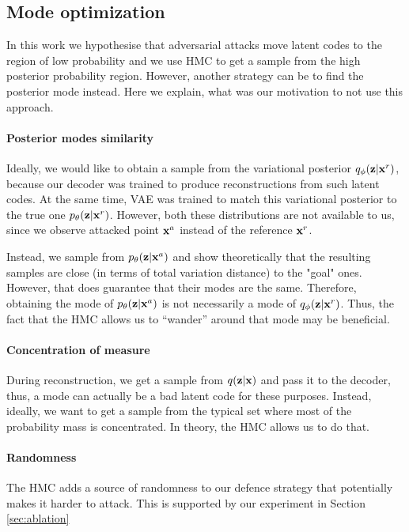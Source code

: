 
\subsection{Mode optimization}\label{appendix:hmc_vs_opt}

In this work we hypothesise that adversarial attacks move latent codes to the region of low probability and we use HMC to get a sample from the high posterior probability region. However, another strategy can be to find the posterior mode instead. Here we explain, what was our motivation to not use this approach. 

\paragraph{Posterior modes similarity}
Ideally, we would like to obtain a sample from the variational posterior $q_{\phi}({\mathbf{z}}|{\mathbf{x}}^r)$, because our decoder was trained to produce reconstructions from such latent codes. At the same time, VAE was trained to match this variational posterior to the true one $p_{\theta}({\mathbf{z}}|{\mathbf{x}}^r)$. However, both these distributions are not available to us, since we observe attacked point ${\mathbf{x}}^a$ instead of the reference ${\mathbf{x}}^r$. 

Instead, we sample from $p_{\theta}({\mathbf{z}}|{\mathbf{x}}^a)$ and show theoretically that the resulting samples are close (in terms of total variation distance) to the "goal" ones. However, that does guarantee that their modes are the same. Therefore, obtaining the mode of $p_{\theta}({\mathbf{z}}|{\mathbf{x}}^a)$  is not necessarily a mode of $q_{\phi}({\mathbf{z}}|{\mathbf{x}}^r)$. Thus, the fact that the HMC allows us to “wander” around that mode may be beneficial. 

\paragraph{Concentration of measure}
During reconstruction, we get a sample from $q({\mathbf{z}}|{\mathbf{x}})$ and pass it to the decoder, thus, a mode can actually be a bad latent code for these purposes. Instead, ideally, we want to get a sample from the typical set where most of the probability mass is concentrated. In theory, the HMC allows us to do that.

\paragraph{Randomness}
The HMC adds a source of randomness to our defence strategy that potentially makes it harder to attack. This is supported by our experiment in Section \ref{sec:ablation}
